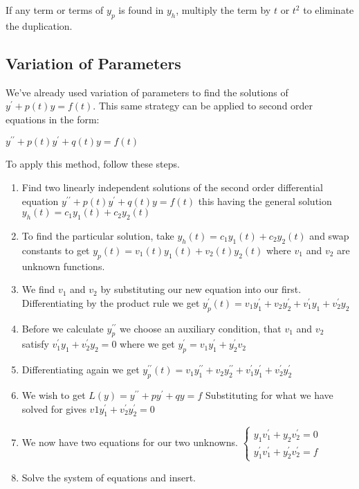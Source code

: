 \documentclass[12pt,landscape,twocolumn]{article}
\begin{document}
    If any term or terms of $y_p$ is found in $y_h$, multiply the term by $t$ or $t^2$ to eliminate the duplication.

    \subsection{Variation of Parameters}
    We've already used variation of parameters to find the solutions of $y^\prime + p(t) y = f(t)$. This same strategy can be applied to second order equations in the form:

        $ y^{\prime\prime} + p(t)y^\prime + q(t)y = f(t) $

    To apply this method, follow these steps.

        \begin{enumerate}
            \item Find two linearly independent solutions of the second order differential equation
                    $ y^{\prime\prime} + p(t)y^\prime + q(t)y = f(t) $
                this having the general solution
                $ y_h(t) = c_1 y_1(t) + c_2y_2(t) $
            \item To find the particular solution, take
                $ y_h(t) = c_1 y_1(t) + c_2y_2(t) $
                and swap constants to get
                $ y_p(t) = v_1(t) y_1(t) + v_2(t)y_2(t) $
                where $v_1$ and $v_2$ are unknown functions.
            \item We find $v_1$ and $v_2$ by substituting our new equation into our first. Differentiating by the product rule we get
                $ y_p^\prime(t) = v_1 y_1^\prime + v_2y_2^\prime + v_1^\prime y_1 + v_2^\prime y_2 $
            \item Before we calculate $y_p^{\prime\prime}$ we choose an auxiliary condition, that $v_1$ and $v_2$ satisfy
                $ v_1^\prime y_1 + v_2^\prime y_2 = 0 $
                where we get
                $ y_p ^\prime = v_1 y_1^\prime + y_2^\prime v_2 $
            \item Differentiating again we get
                $ y_p^{\prime\prime}(t) = v_1 y_1^{\prime\prime} + v_2 y_2^{\prime\prime} + v_1^\prime y_1^\prime + v_2^\prime y_2^\prime $
            \item We wish to get
                $ L(y) = y^{\prime\prime} + py^\prime + qy = f $
                Substituting for what we have solved for gives
                $ v1 y_1^\prime + v_2^\prime y_2^\prime = 0 $
            \item We now have two equations for our two unknowns.
                $ \begin{cases}
                    y_1 v_1^\prime + y_2 v_2^\prime = 0\\
                    y_1^\prime v_1^\prime + y_2^\prime v_2^\prime = f
                 \end{cases} $
            \item Solve the system of equations and insert.
        \end{enumerate}
\end{document}
